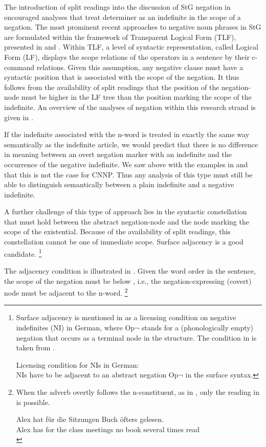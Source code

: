 \documentclass[output=paper]{langsci/langscibook}
\begin{document}
The introduction of split readings into the discussion of StG negation in \citet{Jacobs:80} encouraged analyses that treat determiner  as an indefinite  in the scope of a negation. 
%
The most prominent recent approaches to negative noun phrases in StG are formulated within the framework of Transparent Logical Form (TLF), presented in \citet{Stechow:93}  and \citet{Heim:Kratzer:98}.
Within TLF, a level of syntactic representation, called Logical Form (LF), displays the scope relations of the operators in a sentence by their c-command relations. 
Given this assumption, any negative clause must have a syntactic position that is associated with the scope of the negation. 
It thus follows from the availability of split readings that the position of the negation-node must be higher in the LF tree than the position marking the scope of the indefinite. 
An overview of the analyses of negation within this research strand is given in \citet{Zeijlstra:16}.

If the indefinite associated with the n-word is treated in exactly the same way semantically as the indefinite article, we would predict that there is no difference in meaning between an overt negation marker with an indefinite and the occurrence of the negative indefinite. We saw above with the examples in  and  that this is not the case for CNNP. Thus any analysis of this type must still be able to distinguish semantically between a plain indefinite and a negative indefinite.

A further challenge of this type of approach lies in the syntactic constellation that must hold between the abstract negation-node and the node marking the scope of the existential.
Because of the availability of split readings, this constellation cannot be one of immediate scope. Surface adjacency is a good candidate.%
\footnote{Surface adjacency is mentioned in \citet{Penka:11} as a licensing condition on negative indefinites (NI) in German, where Op$\lnot$ stands for a (phonologically empty) negation that occurs as a terminal node in the structure. The condition in  is taken from \citet[112]{Penka:11}.

\ea \label{penka-adjacent}
Licensing condition for NIs in German:\\
NIs have to be adjacent to an abstract negation Op$\lnot$ in the surface syntax.
\z}

The adjacency condition is illustrated in . Given the word order in the sentence, the scope of the negation must be below , i.e., the negation-expressing (covert) node 
must be adjacent to the n-word.%
\footnote{When the adverb overtly follows the n-constituent, as in
  , only the reading in  is
  possible.
  
\ea \label{not-often}
\gll Alex hat für die Sitzungen  Buch öfters gelesen.\\
Alex has for the {class meetings} no book {several times} read\\
\z}
\end{document}

